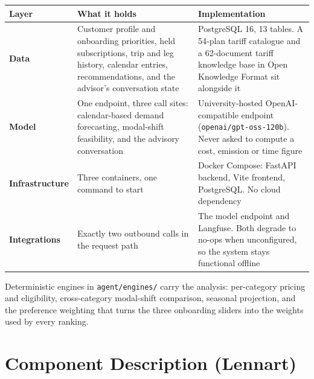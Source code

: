 \documentclass[
  11pt,
  a4paper,
  DIV=11,
  numbers=noendperiod,
  notitlepage]{scrreprt}
\newcounter{none} %
\begin{document}
{\def\LTcaptype{none} %
\begin{longtable}[]{@{}
  >{\raggedright\arraybackslash}p{}
  >{\raggedright\arraybackslash}p{}
  >{\raggedright\arraybackslash}p{}@{}}
\toprule\noalign{}
\begin{minipage}[b]{\linewidth}\raggedright
Layer
\end{minipage} & \begin{minipage}[b]{\linewidth}\raggedright
What it holds
\end{minipage} & \begin{minipage}[b]{\linewidth}\raggedright
Implementation
\end{minipage} \\
\midrule\noalign{}
\endhead
\bottomrule\noalign{}
\endlastfoot
\textbf{Data} & Customer profile and onboarding priorities, held
subscriptions, trip and leg history, calendar entries, recommendations,
and the advisor's conversation state & PostgreSQL 16, 13 tables. A
54-plan tariff catalogue and a 62-document tariff knowledge base in Open
Knowledge Format sit alongside it \\
\textbf{Model} & One endpoint, three call sites: calendar-based demand
forecasting, modal-shift feasibility, and the advisory conversation &
University-hosted OpenAI-compatible endpoint
(\texttt{openai/gpt-oss-120b}). Never asked to compute a cost, emission
or time figure \\
\textbf{Infrastructure} & Three containers, one command to start &
Docker Compose: FastAPI backend, Vite frontend, PostgreSQL. No cloud
dependency \\
\textbf{Integrations} & Exactly two outbound calls in the request path &
The model endpoint and Langfuse. Both degrade to no-ops when
unconfigured, so the system stays functional offline \\
\end{longtable}
}

Deterministic engines in \texttt{agent/engines/} carry the analysis:
per-category pricing and eligibility, cross-category modal-shift
comparison, seasonal projection, and the preference weighting that turns
the three onboarding sliders into the weights used by every ranking.

\section{Component Description
(Lennart)}\label{component-description-lennart}
\end{document}
